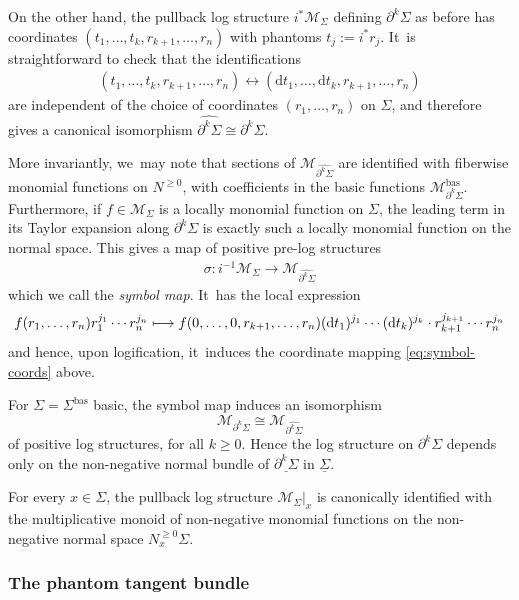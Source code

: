 \documentclass[10pt]{amsart}
\newcommand\mto{\mathchoice{\longmapsto}{\mapsto}{\mapsto}{\mapsto}}
\theoremstyle{definition}
\theoremstyle{remark}
\let\defn\emph
\renewcommand{\ge}{\geqslant}
\newcommand{\cM}{\mathscr{M}}
\newcommand{\cMbas}{\mathscr{M}^{\mathrm{bas}}}
\newcommand{\dd}{\mathrm{d}}
\newcommand{\Sig}{\Sigma}
\newcommand{\uSig}{\underline{\Sigma}}
\newcommand{\bas}[1]{{#1}^{\mathrm{bas}}}
\newcommand{\Sigbas}{\bas{\Sig}}
\newcommand{\ubdSig}[1][]{\underline{\partial^{#1}\Sigma}}
\newcommand{\bdSig}[1][]{\partial^{#1}\Sigma}
\begin{document}
On the other hand, the pullback log structure $i^*\cM_{\Sig}$ defining $\bdSig[k]$ as before has coordinates $(t_1,\ldots,t_k,r_{k+1},\ldots,r_n)$ with phantoms $t_j := i^* r_j$. It~is straightforward to check that the identifications
\begin{align}(t_1,\ldots,t_k,r_{k+1},\ldots,r_n)\longleftrightarrow
(\dd t_1,\ldots, \dd t_k,r_{k+1},\ldots,r_n) \label{eq:symbol-coords}
\end{align}
are independent of the choice of coordinates $(r_1,\ldots,r_n)$ on $\Sig$, and therefore gives a canonical isomorphism $\widehat{\bdSig[k]} \cong \bdSig[k]$.

More invariantly, we~may note that sections of $\cM_{\widehat{\bdSig[k]}}$ are identified with fiberwise monomial functions on $N^{\ge0}$, with coefficients in the basic functions $\cMbas_{\bdSig[k]}$. Furthermore, if $f \in \cM_{\Sig}$ is a locally monomial function on $\Sig$, the leading term in its Taylor expansion along $\bdSig[k]$ is exactly such a locally monomial function on the normal space. This gives a map of positive pre-log structures
\begin{align}
\sigma \colon
i^{-1} \cM_{\Sig} \to \cM_{\widehat{\bdSig[k]}} \label{eq:symbol-map}
\end{align}
which we call the \defn{symbol map}. It~has the local expression
\[
f(r_1,\ldots,r_n)r_1^{j_1}\cdots r_n^{j_n} \mto f(0,\ldots,0,r_{k+1},\ldots,r_n) (\dd t_1)^{j_1} \cdots (\dd t_k)^{j_k} \cdot r_{k+1}^{j_{k+1}}\cdots r_n^{j_n}
\]
and hence, upon logification, it~induces the coordinate mapping \eqref{eq:symbol-coords} above.

\begin{proposition}\label{prop:normal-cone}
For $\Sig=\Sigbas$ basic, the symbol map induces an isomorphism
\[
\cM_{\bdSig[k]} \cong \cM_{\widehat{\bdSig[k]}}
\]
of positive log structures, for all $k \ge 0$. Hence the log structure on $\bdSig[k]$ depends only on the non-negative normal bundle of $\ubdSig[k]$ in $\uSig$.
\end{proposition}

\begin{corollary}\label{cor:normal-monoid}
For every $x \in \Sig$, the pullback log structure $\cM_{\Sig}|_x$ is canonically identified with the multiplicative monoid of non-negative monomial functions on the non-negative normal space $N^{\ge0}_x\Sig$.
\end{corollary}

\subsubsection{The phantom tangent bundle}\label{sec:phantom-tangent}
\end{document}
